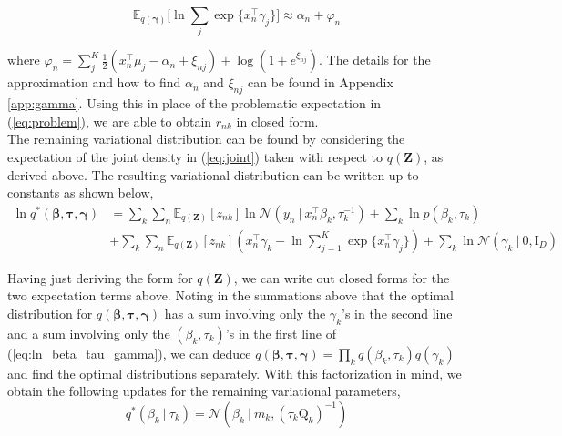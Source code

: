 \documentclass[twoside,11pt]{article}
\newcommand{\tr}{\intercal}
\newcommand{\eye}{\mathrm{I}}
\newcommand\given[1][]{\:#1\vert\:}
\newcommand{\transpose}[1]{#1^{\intercal}}
\newcommand{\kprod}{\prod\limits_{k}}
\newcommand{\nsum}{\sum\limits_{n}}
\newcommand{\ksum}{\sum\limits_{k}}
\newcommand{\boldbeta}{\boldsymbol\beta}
\newcommand{\boldgamma}{\boldsymbol\gamma}
\newcommand{\boldtau}{\boldsymbol\tau}
\newcommand{\sumexp}{\sum_{j=1}^{K} \exp \{ \transpose{x_n} \gamma_j \}}
\newcommand{\E}{\mathbb{E}}
\newcommand{\pr}[1]{p \left( #1 \right)}
\begin{document}
\begin{equation} \label{eq:bouchard_approx}
	\E_{q(\boldsymbol\gamma)}\big[\ln \sum_{j} \exp \{ x_n^{\tr} \gamma_j \} \big] \approx \alpha_n + \varphi_n
\end{equation}

where $\varphi_n =  \sum\limits_{j}^K \frac{1}{2}\left(x_n^{\tr}\mu_j - \alpha_n + \xi_{nj}\right) + \log( 1 + e^{\xi_{nj}})$. The details for the approximation and how to find $\alpha_n$ and $\xi_{nj}$ can be found in Appendix \ref{app:gamma}. Using this in place of the problematic expectation in (\ref{eq:problem}), we are able to obtain $r_{nk}$ in closed form. \\

The remaining variational distribution can be found by considering the expectation of the joint density in (\ref{eq:joint}) taken with respect to $q(\mathbf{Z})$, as derived above. The resulting variational distribution can be written up to constants as shown below,
\begin{equation} \label{eq:ln_beta_tau_gamma}
\begin{split}
	\ln q^{*}(\boldbeta, \boldtau, \boldgamma) &=  \ksum \nsum  \E_{q(\mathbf{Z})}[z_{nk}] \ln \mathcal{N} \left( y_n \given \transpose{x_n} \beta_k, \tau_{k}^{-1} \right) + \ksum \ln \pr{\beta_k, \tau_k} \\
	& + \ksum \nsum \E_{q(\mathbf{Z})}[z_{nk}] \left( \transpose{x_n} \gamma_k - \ln  \sumexp \right) + \ksum \ln \mathcal{N}(\gamma_k \given 0, \eye_D)
\end{split}
\end{equation}

Having just deriving the form for $q(\mathbf{Z})$, we can write out closed forms for the two expectation terms above. Noting in the summations above that the optimal distribution for $q(\boldbeta, \boldtau, \boldgamma)$ has a sum involving only the $\gamma_k$'s in the second line and a sum involving only the $(\beta_k, \tau_k)$'s in the first line of (\ref{eq:ln_beta_tau_gamma}), we can deduce $q(\boldbeta, \boldtau, \boldgamma) = \kprod q(\beta_k, \tau_k) q(\gamma_k)$ and find the optimal distributions separately. With this factorization in mind, we obtain the following updates for the remaining variational parameters,
\begin{equation} \label{optimal_beta_given_tau}
	q^{*}(\beta_k \given \tau_k) = \mathcal{N}\left(\beta_k \given m_k, (\tau_k \mathrm{Q}_k)^{-1} \right)
\end{equation}
\end{document}
